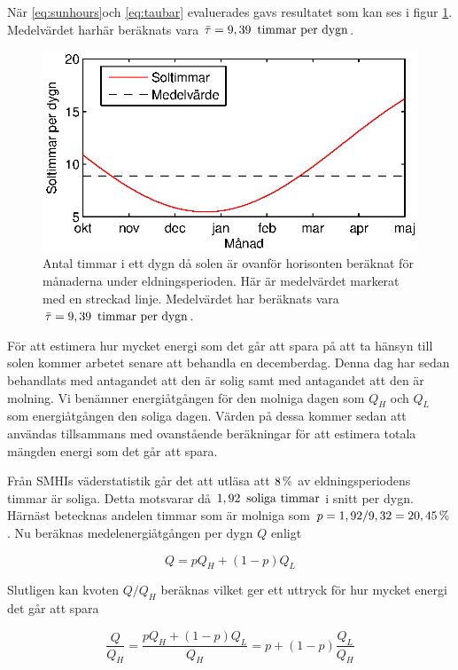 \noindent
När \eqref{eq:sunhours}och \eqref{eq:taubar} evaluerades gavs 
resultatet som kan ses i figur \ref{fig:sunhours}.
Medelvärdet harhär beräknats vara $\bar{\tau}=\unit[9,39]{~timmar~per~dygn}$.
\begin{figure}
\centering
\includegraphics{images/sunhours.eps}
\caption{Antal timmar i ett dygn då solen är ovanför horisonten beräknat för månaderna under eldningsperioden.
Här är medelvärdet markerat med en streckad linje. Medelvärdet har beräknats vara
$\bar{\tau}=\unit[9,39]{~timmar~per~dygn}$.}
\label{fig:sunhours}
\end{figure}

\noindent
För att estimera hur mycket energi som det går att spara på att ta hänsyn till solen kommer arbetet
senare att behandla en decemberdag. Denna dag har sedan behandlats med antagandet att den är solig samt
med antagandet att den är molning. Vi benämner energiåtgången för den molniga dagen som $Q_H$ och
$Q_L$ som energiåtgången den soliga dagen. Värden på dessa kommer sedan att användas tillsammans med
ovanstående beräkningar för att estimera totala mängden energi som det går att spara. 

Från SMHIs väderstatistik går det att utläsa att $\unit[8]{\%}$ av eldningsperiodens timmar är soliga.\cite{SMHIdata}
Detta motsvarar då $\unit[1,92]{~soliga~timmar}$ i snitt per dygn. Härnäst betecknas andelen timmar som är molniga som
$p = 1,92/9,32 = \unit[20,45]{\%}$. Nu beräknas medelenergiåtgången per dygn $Q$ enligt

\begin{equation}
Q = pQ_H + (1-p)Q_L
\end{equation}

\noindent
Slutligen kan kvoten $Q/Q_H$ beräknas vilket ger ett uttryck för hur mycket energi det går att spara

\begin{equation}
\frac{Q}{Q_H} = \frac{pQ_H + (1-p)Q_L}{Q_H} = p+(1-p)\frac{Q_L}{Q_H}
\end{equation}

